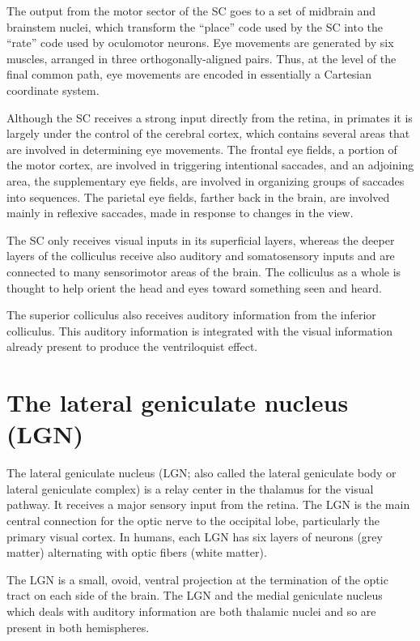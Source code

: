 \documentclass[]{book}
\begin{document}
The output from the motor sector of the SC goes to a set of midbrain and brainstem nuclei, which transform the ``place'' code used by the SC into the ``rate'' code used by oculomotor neurons. Eye movements are generated by six muscles, arranged in three orthogonally-aligned pairs. Thus, at the level of the final common path, eye movements are encoded in essentially a Cartesian coordinate system.

Although the SC receives a strong input directly from the retina, in primates it is largely under the control of the cerebral cortex, which contains several areas that are involved in determining eye movements. The frontal eye fields, a portion of the motor cortex, are involved in triggering intentional saccades, and an adjoining area, the supplementary eye fields, are involved in organizing groups of saccades into sequences. The parietal eye fields, farther back in the brain, are involved mainly in reflexive saccades, made in response to changes in the view.

The SC only receives visual inputs in its superficial layers, whereas the deeper layers of the colliculus receive also auditory and somatosensory inputs and are connected to many sensorimotor areas of the brain. The colliculus as a whole is thought to help orient the head and eyes toward something seen and heard.

The superior colliculus also receives auditory information from the inferior colliculus. This auditory information is integrated with the visual information already present to produce the ventriloquist effect.

\hypertarget{the-lateral-geniculate-nucleus-lgn}{%
\section{The lateral geniculate nucleus (LGN)}\label{the-lateral-geniculate-nucleus-lgn}}

The lateral geniculate nucleus (LGN; also called the lateral geniculate body or lateral geniculate complex) is a relay center in the thalamus for the visual pathway. It receives a major sensory input from the retina. The LGN is the main central connection for the optic nerve to the occipital lobe, particularly the primary visual cortex. In humans, each LGN has six layers of neurons (grey matter) alternating with optic fibers (white matter).

The LGN is a small, ovoid, ventral projection at the termination of the optic tract on each side of the brain. The LGN and the medial geniculate nucleus which deals with auditory information are both thalamic nuclei and so are present in both hemispheres.
\end{document}
